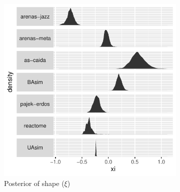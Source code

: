 \documentclass[
  10pt,
  a4paper,
]{scrreprt}
\theoremstyle{plain}
\theoremstyle{plain}
\theoremstyle{definition}
\theoremstyle{plain}
\theoremstyle{remark}
\begin{document}
{\begin{figure}
\begin{minipage}[t]{0.50\linewidth}
{\begin{figure}[H]
{\centering \includegraphics[width=1\textwidth,height=\textheight]{doc_files/figure-pdf/fig-shape-1.pdf}

}

\caption{\label{fig-shape}Posterior of shape (\(\xi\))}

\end{figure}

}

\end{minipage}%
%
\begin{minipage}[t]{0.50\linewidth}

{\centering 

\begin{figure}[H]


\end{figure}}
\end{minipage}
\end{figure}}
\end{document}
